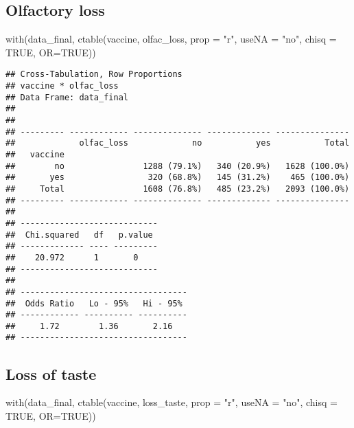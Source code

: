 \documentclass[
]{article}
\newenvironment{Shaded}{\begin{snugshade}}{\end{snugshade}}
\newcommand{\AttributeTok}[1]{\textcolor[rgb]{0.77,0.63,0.00}{#1}}
\newcommand{\ConstantTok}[1]{\textcolor[rgb]{0.00,0.00,0.00}{#1}}
\newcommand{\FunctionTok}[1]{\textcolor[rgb]{0.00,0.00,0.00}{#1}}
\newcommand{\NormalTok}[1]{#1}
\newcommand{\StringTok}[1]{\textcolor[rgb]{0.31,0.60,0.02}{#1}}
\begin{document}
\hypertarget{olfactory-loss}{%
\subsection{Olfactory loss}\label{olfactory-loss}}

\begin{Shaded}
\begin{Highlighting}[]
\FunctionTok{with}\NormalTok{(data\_final, }\FunctionTok{ctable}\NormalTok{(vaccine, olfac\_loss, }\AttributeTok{prop =} \StringTok{"r"}\NormalTok{, }\AttributeTok{useNA =} \StringTok{"no"}\NormalTok{, }\AttributeTok{chisq =} \ConstantTok{TRUE}\NormalTok{, }\AttributeTok{OR=}\ConstantTok{TRUE}\NormalTok{))}
\end{Highlighting}
\end{Shaded}

\begin{verbatim}
## Cross-Tabulation, Row Proportions  
## vaccine * olfac_loss  
## Data Frame: data_final  
## 
## 
## --------- ------------ -------------- ------------- ---------------
##             olfac_loss             no           yes           Total
##   vaccine                                                          
##        no                1288 (79.1%)   340 (20.9%)   1628 (100.0%)
##       yes                 320 (68.8%)   145 (31.2%)    465 (100.0%)
##     Total                1608 (76.8%)   485 (23.2%)   2093 (100.0%)
## --------- ------------ -------------- ------------- ---------------
## 
## ----------------------------
##  Chi.squared   df   p.value 
## ------------- ---- ---------
##    20.972      1       0    
## ----------------------------
## 
## ----------------------------------
##  Odds Ratio   Lo - 95%   Hi - 95% 
## ------------ ---------- ----------
##     1.72        1.36       2.16   
## ----------------------------------
\end{verbatim}

\hypertarget{loss-of-taste}{%
\subsection{Loss of taste}\label{loss-of-taste}}

\begin{Shaded}
\begin{Highlighting}[]
\FunctionTok{with}\NormalTok{(data\_final, }\FunctionTok{ctable}\NormalTok{(vaccine, loss\_taste, }\AttributeTok{prop =} \StringTok{"r"}\NormalTok{, }\AttributeTok{useNA =} \StringTok{"no"}\NormalTok{, }\AttributeTok{chisq =} \ConstantTok{TRUE}\NormalTok{, }\AttributeTok{OR=}\ConstantTok{TRUE}\NormalTok{))}
\end{Highlighting}
\end{Shaded}
\end{document}
